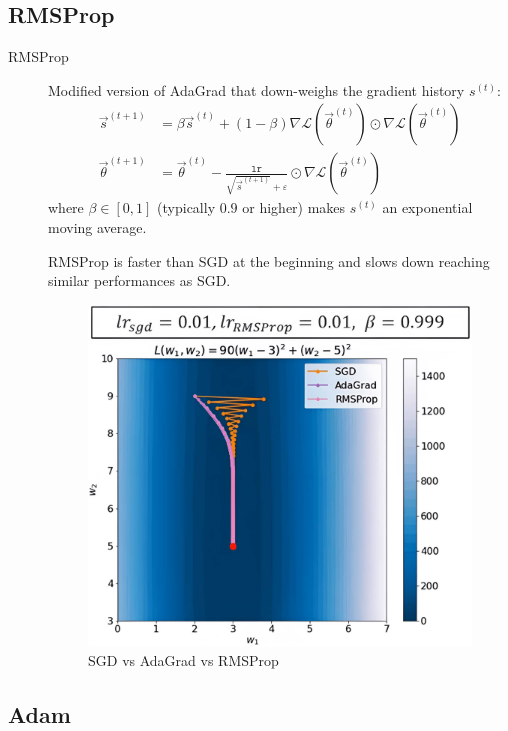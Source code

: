 \subsection{RMSProp}

\begin{description}
    \item[RMSProp] 
        Modified version of AdaGrad that down-weighs the gradient history $s^{(t)}$:
        \[
            \begin{split}
                \vec{s}^{(t+1)} &= \beta \vec{s}^{(t)} + (1-\beta) \nabla\mathcal{L}(\vec{\theta}^{(t)}) \odot \nabla\mathcal{L}(\vec{\theta}^{(t)}) \\
                \vec{\theta}^{(t+1)} &= \vec{\theta}^{(t)} - \frac{\texttt{lr}}{\sqrt{\vec{s}^{(t+1)}} + \varepsilon} \odot \nabla\mathcal{L}(\vec{\theta}^{(t)})
            \end{split}
        \]
        where $\beta \in [0, 1]$ (typically $0.9$ or higher) makes $s^{(t)}$ an exponential moving average.

        \begin{remark}
            RMSProp is faster than SGD at the beginning and slows down reaching similar performances as SGD.
        \end{remark}

        \begin{figure}[H]
            \centering
            \includegraphics[width=0.35\linewidth]{./img/rmsprop.jpg}
            \caption{SGD vs AdaGrad vs RMSProp}
        \end{figure}
\end{description}


\subsection{Adam}

